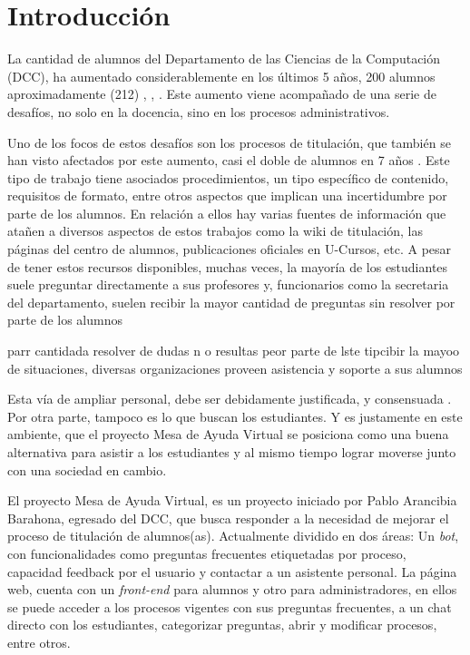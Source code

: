 \documentclass[guia]{upropuesta}
\begin{document}
\section{Introducción}\label{sec:intro}
    \par La cantidad de alumnos del Departamento de las Ciencias de la Computación (DCC), ha aumentado considerablemente en los últimos 5 años, 200 alumnos aproximadamente (212) \cite{CADCC2016}, \cite{CaDCC2018}, \cite{CADCC2021}. Este aumento viene acompañado de una serie de desafíos, no solo en la docencia, sino en los procesos administrativos. 
    \par Uno de los focos de estos desafíos son los procesos de titulación, que también se han visto afectados por este aumento, casi el doble de alumnos en 7 años \cite{ARANCIBIA2021}. Este tipo de trabajo tiene asociados procedimientos, un tipo específico de contenido, requisitos de formato, entre otros aspectos que implican una incertidumbre por parte de los alumnos. En relación a ellos hay varias fuentes de información que atañen a diversos aspectos de estos trabajos como la wiki de titulación, las páginas del centro de alumnos, publicaciones oficiales en U-Cursos, etc. A pesar de tener estos recursos disponibles, muchas veces, la mayoría de los estudiantes suele preguntar directamente a sus profesores y, funcionarios como la secretaria del departamento, suelen recibir la mayor cantidad de preguntas sin resolver por parte de los alumnos
    \par parr cantidada resolver de dudas n o resultas peor parte de lste tipcibir la mayoo de situaciones, diversas organizaciones proveen asistencia y soporte a sus alumnos
    \par Esta vía de ampliar personal, debe ser debidamente justificada, y consensuada \cite{Chile2014}. Por otra parte, tampoco es lo que buscan los estudiantes. Y es justamente en este ambiente, que el proyecto Mesa de Ayuda Virtual se posiciona como una buena alternativa para asistir a los estudiantes y al mismo tiempo lograr moverse junto con una sociedad en cambio.
    \par El proyecto Mesa de Ayuda Virtual, es un proyecto iniciado por Pablo Arancibia Barahona, egresado del DCC, que busca responder a la necesidad de mejorar el proceso de titulación de alumnos(as). Actualmente dividido en dos áreas: Un \textit{bot}, con funcionalidades como preguntas frecuentes etiquetadas por proceso, capacidad feedback por el usuario y contactar a un asistente personal. La página web, cuenta con un \textit{front-end} para alumnos y otro para administradores, en ellos se puede acceder a los procesos vigentes con sus preguntas frecuentes, a un chat directo con los estudiantes, categorizar preguntas, abrir y modificar procesos, entre otros.
\end{document}
